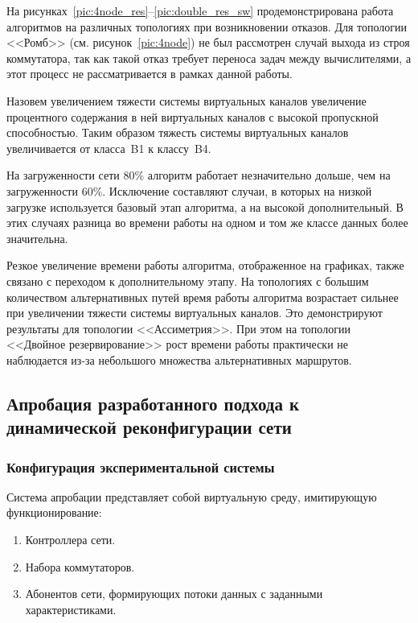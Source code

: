 \documentclass[12pt, a4paper]{article}
\begin{document}
На рисунках~\ref{pic:4node_res}--\ref{pic:double_res_sw} продемонстрирована работа алгоритмов на различных топологиях при возникновении отказов. Для топологии <<Ромб>> (см. рисунок~\ref{pic:4node}) не был рассмотрен случай выхода из строя коммутатора, так как такой отказ требует переноса задач между вычислителями, а этот процесс не рассматривается в рамках данной работы.

Назовем увеличением тяжести системы виртуальных каналов увеличение процентного содержания в ней виртуальных каналов с высокой пропускной способностью. Таким образом тяжесть системы виртуальных каналов увеличивается от класса~B1 к классу~B4. 

На загруженности сети 80\% алгоритм работает незначительно дольше, чем на загруженности 60\%. Исключение составляют случаи, в которых на низкой загрузке используется базовый этап алгоритма, а на высокой дополнительный. В этих случаях разница во времени работы на одном и том же классе данных более значительна.

Резкое увеличение времени работы алгоритма, отображенное на графиках, также связано с переходом к дополнительному этапу. На топологиях с большим количеством альтернативных путей время работы алгоритма возрастает сильнее при увеличении тяжести системы виртуальных каналов. Это демонстрируют результаты для топологии <<Ассиметрия>>. При этом на топологии <<Двойное резервирование>> рост времени работы практически не наблюдается из-за небольшого множества альтернативных маршрутов.

\FloatBarrier

\subsection{Апробация разработанного подхода к динамической реконфигурации сети} \label{subsec:approbation}
\subsubsection{Конфигурация экспериментальной системы}
Система апробации представляет собой виртуальную среду, имитирующую
функционирование:
\begin{enumerate}
	\item Контроллера сети.
	\item Набора коммутаторов.
	\item Абонентов сети, формирующих потоки данных с заданными характеристиками.
\end{enumerate}
\end{document}
